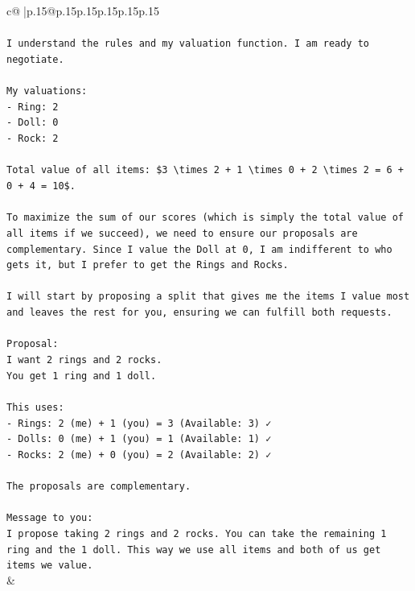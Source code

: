 \documentclass{article}
\begin{document}
{\begin{supertabular}{c@{$\;$}|p{.15\linewidth}@{}p{.15\linewidth}p{.15\linewidth}p{.15\linewidth}p{.15\linewidth}p{.15\linewidth}}
{{{\\ 
\\ 
\texttt{I understand the rules and my valuation function. I am ready to negotiate.} \\
\\ 
\texttt{My valuations:} \\
\texttt{{-} Ring: 2} \\
\texttt{{-} Doll: 0} \\
\texttt{{-} Rock: 2} \\
\\ 
\texttt{Total value of all items: \$3 \textbackslash{}times 2 + 1 \textbackslash{}times 0 + 2 \textbackslash{}times 2 = 6 + 0 + 4 = 10\$.} \\
\\ 
\texttt{To maximize the sum of our scores (which is simply the total value of all items if we succeed), we need to ensure our proposals are complementary. Since I value the Doll at 0, I am indifferent to who gets it, but I prefer to get the Rings and Rocks.} \\
\\ 
\texttt{I will start by proposing a split that gives me the items I value most and leaves the rest for you, ensuring we can fulfill both requests.} \\
\\ 
\texttt{Proposal:} \\
\texttt{I want 2 rings and 2 rocks.} \\
\texttt{You get 1 ring and 1 doll.} \\
\\ 
\texttt{This uses:} \\
\texttt{{-} Rings: 2 (me) + 1 (you) = 3 (Available: 3) ✓} \\
\texttt{{-} Dolls: 0 (me) + 1 (you) = 1 (Available: 1) ✓} \\
\texttt{{-} Rocks: 2 (me) + 0 (you) = 2 (Available: 2) ✓} \\
\\ 
\texttt{The proposals are complementary.} \\
\\ 
\texttt{Message to you:} \\
\texttt{I propose taking 2 rings and 2 rocks. You can take the remaining 1 ring and the 1 doll. This way we use all items and both of us get items we value.} \\
            }
        }
    }
    & \\ \\


\end{supertabular}}
\end{document}
